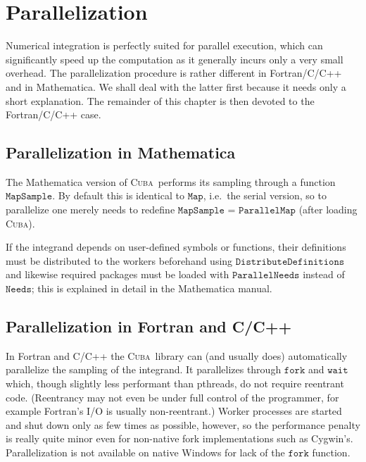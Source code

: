 \documentclass[12pt]{article}
\newcommand\cuba{\textsc{Cuba}}
\newcommand\ie{i.e.\ }
\newcommand\Code[1]{\ensuremath{\texttt{#1}}}
\begin{document}
\section{Parallelization}
\label{sect:parallel}

Numerical integration is perfectly suited for parallel execution, which 
can significantly speed up the computation as it generally incurs only a 
very small overhead.  The parallelization procedure is rather different 
in Fortran/C/C++ and in Mathematica.  We shall deal with the latter 
first because it needs only a short explanation.  The remainder of this 
chapter is then devoted to the Fortran/C/C++ case.


\subsection{Parallelization in Mathematica}

The Mathematica version of \cuba\ performs its sampling through a 
function \Code{MapSample}.  By default this is identical to \Code{Map}, 
\ie the serial version, so to parallelize one merely needs to redefine 
\Code{MapSample = ParallelMap} (after loading \cuba).

If the integrand depends on user-defined symbols or functions, their 
definitions must be distributed to the workers beforehand using 
\Code{DistributeDefinitions} and likewise required packages must be 
loaded with \Code{ParallelNeeds} instead of \Code{Needs}; this is 
explained in detail in the Mathematica manual.


\subsection{Parallelization in Fortran and C/C++}

In Fortran and C/C++ the \cuba\ library can (and usually does) 
automatically parallelize the sampling of the integrand.  It 
parallelizes through \Code{fork} and \Code{wait} which, though slightly 
less performant than pthreads, do not require reentrant code.  
(Reentrancy may not even be under full control of the programmer, for 
example Fortran's I/O is usually non-reentrant.)  Worker processes are 
started and shut down only as few times as possible, however, so the 
performance penalty is really quite minor even for non-native fork 
implementations such as Cygwin's.  Parallelization is not available on 
native Windows for lack of the \Code{fork} function.
\end{document}
